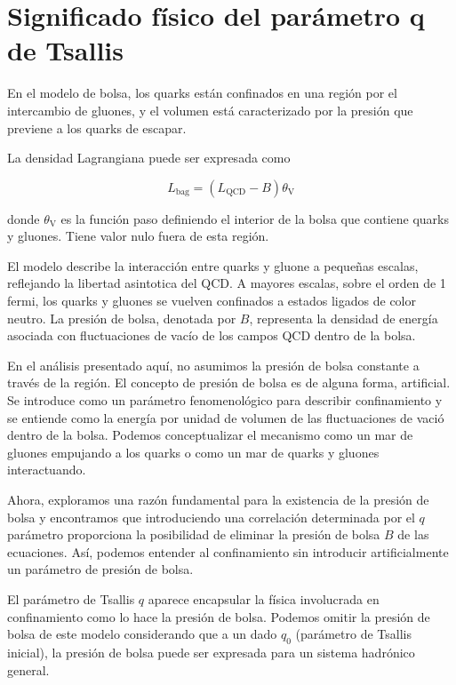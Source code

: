 \chapter{Significado físico del parámetro q de Tsallis}


En el modelo de bolsa, los quarks están confinados en una región por el intercambio de gluones, y el volumen está caracterizado por la presión que previene a los quarks de escapar.

La densidad Lagrangiana puede ser expresada como

\begin{equation}
{L}_{\mathrm{bag}} = \left({L}_{\mathrm{QCD}} - B\right){\theta}_{\mathrm{V}}
\end{equation}

donde ${\theta}_{\mathrm{V}}$ es la función paso definiendo el interior de la bolsa que contiene quarks y gluones. Tiene valor nulo fuera de esta región.

El modelo describe la interacción entre quarks y gluone a pequeñas escalas, reflejando la libertad asintotica del QCD. A mayores escalas, sobre el orden de 1 fermi, los quarks y gluones se vuelven confinados a estados ligados de color neutro. La presión de bolsa, denotada por $B$, representa la densidad de energía asociada con fluctuaciones de vacío de los campos QCD dentro de la bolsa.

En el análisis presentado aquí, no asumimos la presión de bolsa constante a través de la región. El concepto de presión de bolsa es de alguna forma, artificial. Se introduce como un parámetro fenomenológico para describir confinamiento y se entiende como la energía por unidad de volumen de las fluctuaciones de vació dentro de la bolsa. Podemos conceptualizar el mecanismo como un mar de gluones empujando a los quarks o como un mar de quarks y gluones interactuando.

Ahora, exploramos una razón fundamental para la existencia de la presión de bolsa y encontramos que introduciendo una correlación determinada por el $q$ parámetro proporciona la posibilidad de eliminar la presión de bolsa $B$ de las ecuaciones. Así, podemos entender al confinamiento sin introducir artificialmente un parámetro de presión de bolsa.

El parámetro de Tsallis $q$ aparece encapsular la física involucrada en confinamiento como lo hace la presión de bolsa. Podemos omitir la presión de bolsa de este modelo considerando que a un dado ${q}_{0}$ (parámetro de Tsallis inicial), la presión de bolsa puede ser expresada para un sistema hadrónico general.


